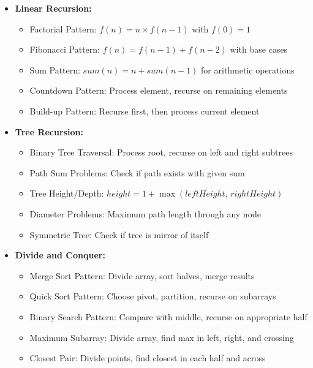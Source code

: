 \documentclass[a4paper,10pt]{book}
\begin{document}
\begin{itemize}[leftmargin=*]
    \item \textbf{Linear Recursion:}
    \begin{itemize}
        \item Factorial Pattern: $f(n) = n \times f(n-1)$ with $f(0)=1$
        \item Fibonacci Pattern: $f(n)=f(n-1)+f(n-2)$ with base cases
        \item Sum Pattern: $sum(n)=n + sum(n-1)$ for arithmetic operations
        \item Countdown Pattern: Process element, recurse on remaining elements
        \item Build-up Pattern: Recurse first, then process current element
    \end{itemize}

    \item \textbf{Tree Recursion:}
    \begin{itemize}
        \item Binary Tree Traversal: Process root, recurse on left and right subtrees
        \item Path Sum Problems: Check if path exists with given sum
        \item Tree Height/Depth: $height=1+\max(leftHeight,\,rightHeight)$
        \item Diameter Problems: Maximum path length through any node
        \item Symmetric Tree: Check if tree is mirror of itself
    \end{itemize}

    \item \textbf{Divide and Conquer:}
    \begin{itemize}
        \item Merge Sort Pattern: Divide array, sort halves, merge results
        \item Quick Sort Pattern: Choose pivot, partition, recurse on subarrays
        \item Binary Search Pattern: Compare with middle, recurse on appropriate half
        \item Maximum Subarray: Divide array, find max in left, right, and crossing
        \item Closest Pair: Divide points, find closest in each half and across
    \end{itemize}
\end{itemize}
\end{document}
